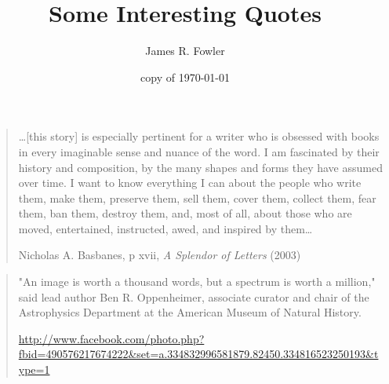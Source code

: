 \documentclass{article}
\begin{document}
\title{Some Interesting Quotes}
\author{James R. Fowler}
\date{copy of \today}
\maketitle

\begin{quote}

\ldots [this story] is especially pertinent for a writer who is
obsessed with books in every imaginable sense and nuance of the
word. I am fascinated by their history and composition, by the many
shapes and forms they have assumed over time. I want to know
everything I can about the people who write them, make them, preserve
them, sell them, cover them, collect them, fear them, ban them,
destroy them, and, most of all, about those who are moved,
entertained, instructed, awed, and inspired by them\ldots

         Nicholas A. Basbanes, p xvii, {\it A Splendor of Letters} (2003)\cite{Basbanes2003}
\end{quote}


\begin{quote}

"An image is worth a thousand words, but a spectrum is worth a
million," said lead author Ben R. Oppenheimer, associate curator and
chair of the Astrophysics Department at the American Museum of
Natural History.

 \url{http://www.facebook.com/photo.php?fbid=490576217674222&set=a.334832996581879.82450.334816523250193&type=1}
\end{quote}

\printbibliography
\end{document}

